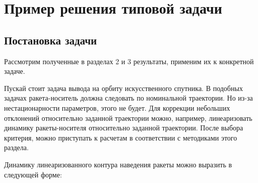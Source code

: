 


\chapter{Пример решения типовой задачи}
\renewcommand{\optU}{  \optimum{\m{u}}  } %
\renewcommand{\funcF}{ \calf{F}         } %

\renewcommand{\optF}{  \optimum{\funcF} } %
\newcommand{\funcS}{   \calf{S}         } %



\section{Постановка задачи}



Рассмотрим полученные в разделах 2 и 3 результаты, применим их к конкретной задаче.

Пускай стоит задача вывода на орбиту искусственного спутника. В подобных задачах ракета-носитель должна следовать по номинальной траектории. Но из-за нестационарности параметров, этого не будет. Для коррекции небольших отклонений относительно заданной траектории можно, например, линеаризовать динамику ракеты-носителя относительно заданной траектории. После выбора критерия, можно приступать к расчетам в соответствии с методиками этого раздела.

Динамику линеаризованного контура наведения ракеты можно выразить в следующей форме:

\eeq

